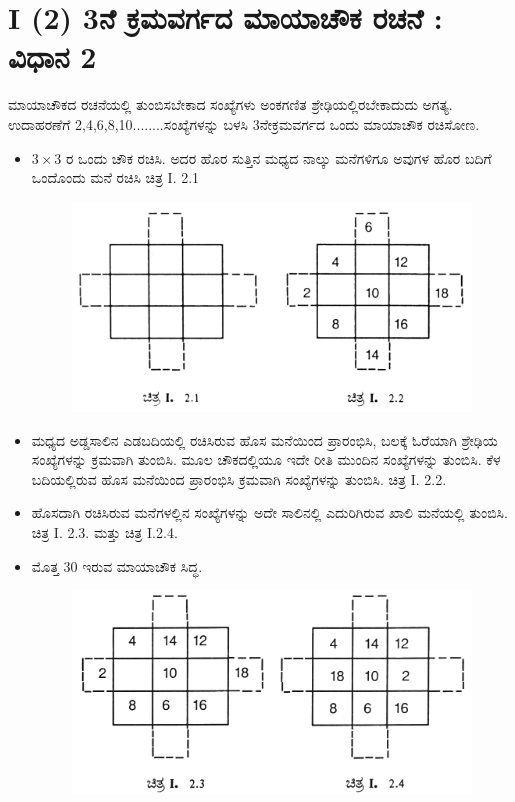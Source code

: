 \newpage

\section*{I (2) 3ನೆ ಕ್ರಮವರ್ಗದ ಮಾಯಾಚೌಕ ರಚನೆ : ವಿಧಾನ 2}

ಮಾಯಾಚೌಕದ ರಚನೆಯಲ್ಲಿ ತುಂಬಿಸಬೇಕಾದ ಸಂಖ್ಯೆಗಳು ಅಂಕಗಣಿತ ಶ್ರೇಢಿ\-ಯಲ್ಲಿರ\-ಬೇಕಾದುದು ಅಗತ್ಯ. ಉದಾಹರಣೆಗೆ 2,4,6,8,10........ಸಂಖ್ಯೆಗಳನ್ನು ಬಳಸಿ 3ನೇ\break ಕ್ರಮವರ್ಗದ ಒಂದು ಮಾಯಾಚೌಕ ರಚಿಸೋಣ.

\begin{itemize}
	\item $3 \times 3$ ರ ಒಂದು ಚೌಕ ರಚಿಸಿ. ಅದರ ಹೊರ ಸುತ್ತಿನ ಮಧ್ಯದ ನಾಲ್ಕು ಮನೆಗಳಿಗೂ ಅವುಗಳ ಹೊರ ಬದಿಗೆ ಒಂದೊಂದು ಮನೆ ರಚಿಸಿ ಚಿತ್ರ I. 2.1
	\begin{figure}[h]
	\includegraphics[scale=.9]{src/figures/chap3/fig3.3.jpg}
	\end{figure}
	\item ಮಧ್ಯದ ಅಡ್ಡಸಾಲಿನ ಎಡಬದಿಯಲ್ಲಿ ರಚಿಸಿರುವ ಹೊಸ ಮನೆಯಿಂದ ಪ್ರಾರಂಭಿಸಿ, ಬಲಕ್ಕೆ ಓರೆಯಾಗಿ ಶ್ರೇಢಿಯ ಸಂಖ್ಯೆಗಳನ್ನು ಕ್ರಮವಾಗಿ ತುಂಬಿಸಿ. ಮೂಲ ಚೌಕದಲ್ಲಿಯೂ ಇದೇ ರೀತಿ ಮುಂದಿನ ಸಂಖ್ಯೆಗಳನ್ನು ತುಂಬಿಸಿ. ಕೆಳ ಬದಿಯಲ್ಲಿರುವ ಹೊಸ ಮನೆಯಿಂದ ಪ್ರಾರಂಭಿಸಿ ಕ್ರಮವಾಗಿ ಸಂಖ್ಯೆಗಳನ್ನು ತುಂಬಿಸಿ. ಚಿತ್ರ I. 2.2.
	\item ಹೊಸದಾಗಿ ರಚಿಸಿರುವ ಮನೆಗಳಲ್ಲಿನ ಸಂಖ್ಯೆಗಳನ್ನು ಅದೇ ಸಾಲಿನಲ್ಲಿ ಎದುರಿಗಿರುವ ಖಾಲಿ ಮನೆಯಲ್ಲಿ ತುಂಬಿಸಿ. ಚಿತ್ರ I. 2.3. ಮತ್ತು ಚಿತ್ರ I.2.4.
	\item ಮೊತ್ತ 30 ಇರುವ ಮಾಯಾಚೌಕ ಸಿದ್ಧ.
	\begin{figure}[h]
	\includegraphics{src/figures/chap3/fig3.4.jpg}
	\end{figure}
\end{itemize}

